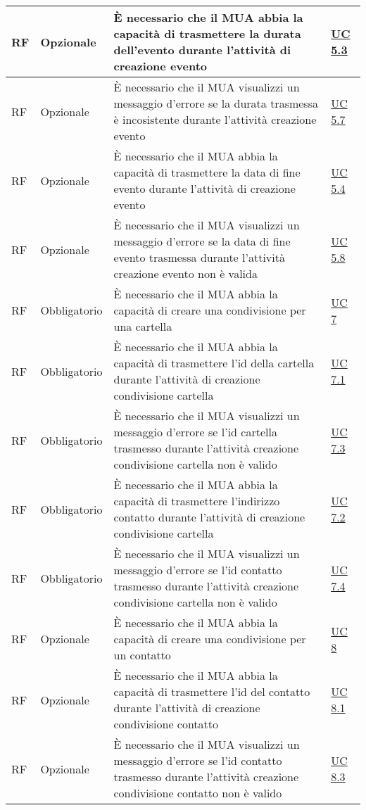 \begin{longtable}{*{1}{>{\centering\arraybackslash}p{1.5cm}}*{1}{>{\centering\arraybackslash}p{2.5cm}}p{6cm}*{1}{>{\centering\arraybackslash}p{3cm}}}
    \\\hline
    RF & Opzionale & È necessario che il MUA abbia la capacità di trasmettere la durata dell'evento durante l'attività di creazione evento & \hyperref[sec:UC5.3]{UC 5.3}
    \\\hline
    RF & Opzionale & È necessario che il MUA visualizzi un messaggio d'errore se la durata trasmessa è incosistente durante l'attività creazione evento & \hyperref[sec:UC5.7]{UC 5.7}
    \\\hline
    RF & Opzionale & È necessario che il MUA abbia la capacità di trasmettere la data di fine evento durante l'attività di creazione evento & \hyperref[sec:UC5.4]{UC 5.4}
    \\\hline
    RF & Opzionale & È necessario che il MUA visualizzi un messaggio d'errore se la data di fine evento trasmessa durante l'attività creazione evento non è valida & \hyperref[sec:UC5.8]{UC 5.8}
    \\\hline
    RF & Obbligatorio & È necessario che il MUA abbia la capacità di creare una condivisione per una cartella & \hyperref[sec:UC7]{UC 7}
    \\\hline
    RF & Obbligatorio & È necessario che il MUA abbia la capacità di trasmettere l'id della cartella durante l'attività di creazione condivisione cartella & \hyperref[sec:UC7.1]{UC 7.1}
    \\\hline
    RF & Obbligatorio & È necessario che il MUA visualizzi un messaggio d'errore se l'id cartella trasmesso durante l'attività creazione condivisione cartella non è valido & \hyperref[sec:UC7.3]{UC 7.3}
    \\\hline
    RF & Obbligatorio & È necessario che il MUA abbia la capacità di trasmettere l'indirizzo contatto durante l'attività di creazione condivisione cartella & \hyperref[sec:UC7.2]{UC 7.2}
    \\\hline
    RF & Obbligatorio & È necessario che il MUA visualizzi un messaggio d'errore se l'id contatto trasmesso durante l'attività creazione condivisione cartella non è valido & \hyperref[sec:UC7.4]{UC 7.4}
    \\\hline
    RF & Opzionale & È necessario che il MUA abbia la capacità di creare una condivisione per un contatto & \hyperref[sec:UC8]{UC 8}
    \\\hline
    RF & Opzionale & È necessario che il MUA abbia la capacità di trasmettere l'id del contatto durante l'attività di creazione condivisione contatto & \hyperref[sec:UC8.1]{UC 8.1}
    \\\hline
    RF & Opzionale & È necessario che il MUA visualizzi un messaggio d'errore se l'id contatto trasmesso durante l'attività creazione condivisione contatto non è valido & \hyperref[sec:UC8.3]{UC 8.3}

\end{longtable}
